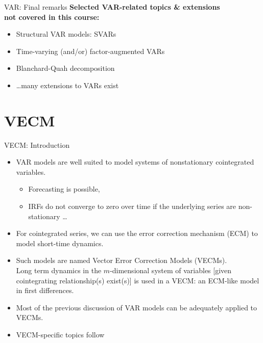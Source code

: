 \documentclass[usenames,dvipsnames]{beamer}
\begin{document}
\begin{frame}{VAR: Final remarks}
\textbf{Selected VAR-related topics \& extensions \\not covered in this course:}\\
\begin{itemize}
\item Structural VAR models: SVARs
\item Time-varying (and/or) factor-augmented VARs
\item Blanchard-Quah decomposition
\item \dots many extensions to VARs exist
\end{itemize}
\end{frame}
\section{VECM}
\begin{frame}{VECM: Introduction}
\begin{itemize}
\item VAR models are well suited to model systems of nonstationary cointegrated variables.
	\begin{itemize}
	\item Forecasting is possible, 
    \item IRFs do not converge to zero over time if the underlying series are non-stationary \dots
	\end{itemize}
\item For cointegrated series, we can use the error correction mechanism (ECM) to model short-time dynamics. 
\item Such models are named Vector Error Correction Models (VECMs). \\
\vspace{0.1cm}	
Long term dynamics in the $m$-dimensional system of variables [given cointegrating relationship(s) exist(s)] is used in a VECM: an ECM-like model in first differences.
	
\item Most of the previous discussion of VAR models can be adequately applied to VECMs.
\item VECM-specific topics follow
\end{itemize}
\end{frame}
\end{document}
